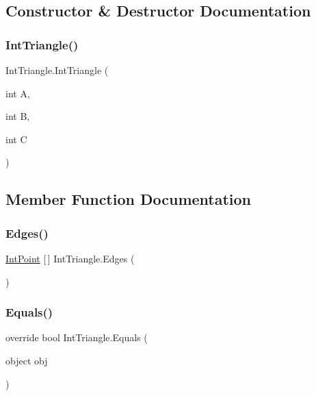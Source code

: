 \subsection{Constructor \& Destructor Documentation}
\mbox{\label{struct_int_triangle_abc1bce82e6902934849a0ba922c51a69}} 
\subsubsection{\texorpdfstring{Int\+Triangle()}{IntTriangle()}}
{\footnotesize\ttfamily Int\+Triangle.\+Int\+Triangle (\begin{DoxyParamCaption}\item[{int}]{A,  }\item[{int}]{B,  }\item[{int}]{C }\end{DoxyParamCaption})}



\subsection{Member Function Documentation}
\mbox{\label{struct_int_triangle_a3ea690497a4287dde9308c49340e33b3}} 
\subsubsection{\texorpdfstring{Edges()}{Edges()}}
{\footnotesize\ttfamily \mbox{\hyperlink{struct_int_point}{Int\+Point}} \mbox{[}$\,$\mbox{]} Int\+Triangle.\+Edges (\begin{DoxyParamCaption}{ }\end{DoxyParamCaption})}

\mbox{\label{struct_int_triangle_ae3d7a680e7679f3c29dd92fe05caf4ed}} 
\subsubsection{\texorpdfstring{Equals()}{Equals()}}
{\footnotesize\ttfamily override bool Int\+Triangle.\+Equals (\begin{DoxyParamCaption}\item[{object}]{obj }\end{DoxyParamCaption})}

